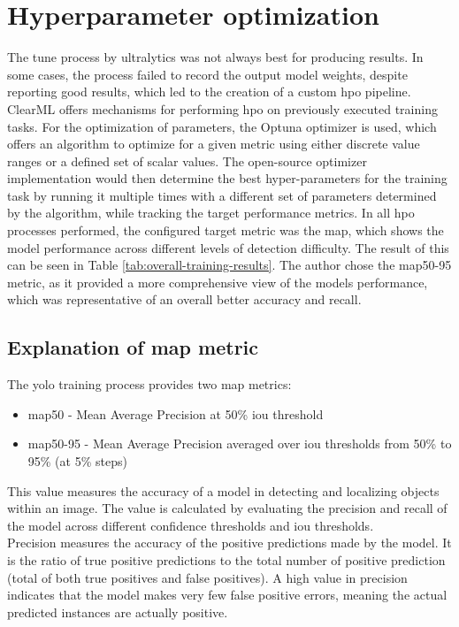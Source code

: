 \documentclass[Bachelor, BIC, english, fhCitStyle, IEEE]{BASE/twbook} %
\newcommand{\nocontentsline}[3]{}
\newcommand{\hidsubsection}[1]{\bgroup\let\addcontentsline=\nocontentsline\subsection{#1}\egroup}
\begin{document}
\section{Hyperparameter optimization}
The tune process by ultralytics was not always best for producing results. In some cases, the process failed to record the output model weights, despite reporting good results, which led to the creation of a custom \ac{hpo} pipeline.\\
ClearML offers mechanisms for performing \ac{hpo} \autocite{HyperparameterOptimizationClearML} on previously executed training tasks. For the optimization of parameters, the Optuna optimizer \autocite{OptunaHyperparameterOptimization} is used, which offers an algorithm to optimize for a given metric using either discrete value ranges or a defined set of scalar values. The open-source optimizer implementation would then determine the best hyper-parameters for the training task by running it multiple times with a different set of parameters determined by the algorithm, while tracking the target performance metrics. In all \ac{hpo} processes performed, the configured target metric was the \ac{map}, which shows the model performance across different levels of detection difficulty. The result of this can be seen in Table \ref{tab:overall-training-results}. The author chose the \ac{map}50-95 metric, as it provided a more comprehensive view of the models performance, which was representative of an overall better accuracy and recall.
\hidsubsection{Explanation of \ac{map} metric}\label{map-explanation}
\noindent
The \ac{yolo} training process provides two \ac{map} metrics:
\begin{itemize}
    \item \ac{map}50 - Mean Average Precision at 50\% \ac{iou} threshold
    \item \ac{map}50-95 - Mean Average Precision averaged over \ac{iou} thresholds from 50\% to 95\% (at 5\% steps)
\end{itemize}
This value measures the accuracy of a model in detecting and localizing objects within an image. The value is calculated by evaluating the precision and recall of the model across different confidence thresholds and \ac{iou} thresholds.\\
Precision measures the accuracy of the positive predictions made by the model. It is the ratio of true positive predictions to the total number of positive prediction (total of both true positives and false positives). A high value in precision indicates that the model makes very few false positive errors, meaning the actual predicted instances are actually positive.\\
\end{document}
